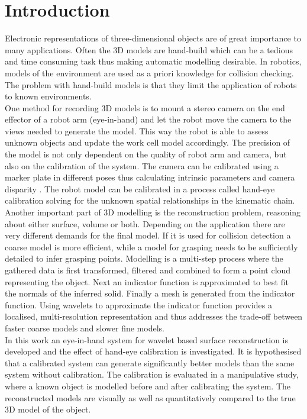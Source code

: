 \chapter{Introduction}
Electronic representations of three-dimensional objects are of great importance to many applications. Often the 3D models are hand-build which can be a tedious and time consuming task thus making automatic modelling desirable. In robotics, models of the environment are used as a priori knowledge for collision checking. The problem with hand-build models is that they limit the application of robots to known environments. \\

One method for recording 3D models is to mount a stereo camera on the end effector of a robot arm (eye-in-hand) and let the robot move the camera to the views needed to generate the model. This way the robot is able to assess unknown objects and update the work cell model accordingly. The precision of the model is not only dependent on the quality of robot arm and camera, but also on the calibration of the system. The camera can be calibrated using a marker plate in different poses thus calculating intrinsic parameters and camera disparity \cite{Zhang2000}. The robot model can be calibrated in a process called hand-eye calibration solving for the unknown spatial relationships in the kinematic chain.\\

Another important part of 3D modelling is the reconstruction problem, reasoning about either surface, volume or both. Depending on the application there are very different demands for the final model. If it is used for collision detection a coarse model is more efficient, while a model for grasping needs to be sufficiently detailed to infer grasping points. Modelling is a multi-step process where the gathered data is first transformed, filtered and combined to form a point cloud representing the object. Next an indicator function is approximated to best fit the normals of the inferred solid. Finally a mesh is generated from the indicator function. Using wavelets to approximate the indicator function provides a localised, multi-resolution representation and thus addresses the trade-off between faster coarse models and slower fine models.\\

In this work an eye-in-hand system for wavelet based surface reconstruction is developed and the effect of hand-eye calibration is investigated. It is hypothesised that a calibrated system can generate significantly better models than the same system without calibration. The calibration is evaluated in a manipulative study, where a known object is modelled before and after calibrating the system. The reconstructed models are visually as well as quantitatively compared to the true 3D model of the object. \\


